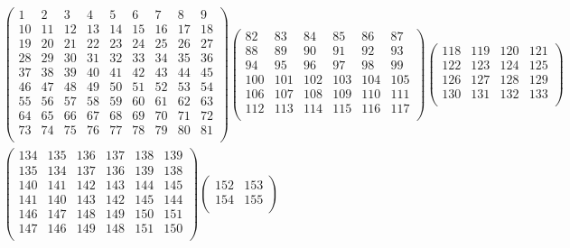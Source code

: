 \documentclass[10pt,a4paper,landscape]{amsart}
\begin{document}
\begin{align*}
\left(\begin{array}{r|r|r|r|r|r|r|r|r}%
1&2&3&4&5&6&7&8&9\\\hline%
10&11&12&13&14&15&16&17&18\\\hline%
19&20&21&22&23&24&25&26&27\\\hline%
28&29&30&31&32&33&34&35&36\\\hline%
37&38&39&40&41&42&43&44&45\\\hline%
46&47&48&49&50&51&52&53&54\\\hline%
55&56&57&58&59&60&61&62&63\\\hline%
64&65&66&67&68&69&70&71&72\\\hline%
73&74&75&76&77&78&79&80&81\\%
\end{array}\right)%
\left(\begin{array}{r|r|r|r|r|r}%
82&83&84&85&86&87\\\hline%
88&89&90&91&92&93\\\hline%
94&95&96&97&98&99\\\hline%
100&101&102&103&104&105\\\hline%
106&107&108&109&110&111\\\hline%
112&113&114&115&116&117\\%
\end{array}\right)%
\left(\begin{array}{r|r|r|r}%
118&119&120&121\\\hline%
122&123&124&125\\\hline%
126&127&128&129\\\hline%
130&131&132&133\\%
\end{array}\right)%
\\
\left(\begin{array}{rr|rr|rr}%
134&135&136&137&138&139\\%
135&134&137&136&139&138\\\hline%
140&141&142&143&144&145\\%
141&140&143&142&145&144\\\hline%
146&147&148&149&150&151\\%
147&146&149&148&151&150\\%
\end{array}\right)%
\left(\begin{array}{r|r}%
152&153\\\hline%
154&155\\%
\end{array}\right)%

\end{align*}
\end{document}
